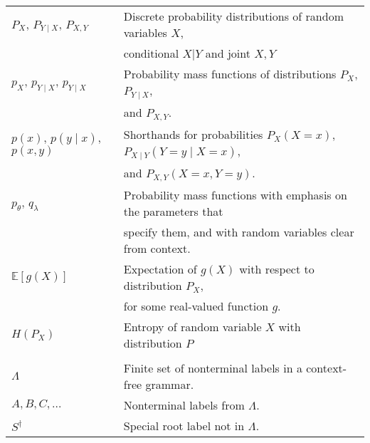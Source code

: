 \documentclass[11pt]{article}
\begin{document}
\begin{table}[h]
\begin{tabular}{l|l}
    $P_X$, $P_{Y \mid X}$, $P_{X, Y}$ & Discrete probability distributions of random variables $X$, \\ & conditional $X \vert Y$ and joint $X, Y$ \\

    $p_{X}$, $p_{Y \mid X}$, $p_{Y \mid X}$ & Probability mass functions of distributions $P_X$, $P_{Y \mid X}$, \\ & and $P_{X, Y}$. \\

    $p(x)$, $p(y \mid x)$, $p(x, y)$ & Shorthands for probabilities $P_{X}(X = x)$, $P_{X \mid Y}(Y = y \mid X = x)$, \\ & and $P_{X, Y}(X = x, Y = y)$. \\

    $p_{\theta}$, $q_{\lambda}$ & Probability mass functions with emphasis on the parameters that \\ & specify them, and with random variables clear from context.  \\

    $\mathbb{E}[g(X)]$ & Expectation of $g(X)$ with respect to distribution $P_X$, \\ & for some real-valued function $g$. \\

    $H(P_X)$ & Entropy of random variable $X$ with distribution $P$ \\
    & \\


    $\Lambda$ & Finite set of nonterminal labels in a context-free grammar.  \\
    $A, B, C, \dots$ & Nonterminal labels from $\Lambda$.  \\
    $S^{\dagger}$ & Special root label not in $\Lambda$.  \\



    \hline\hline
  \end{tabular}

\end{table}
\end{document}
